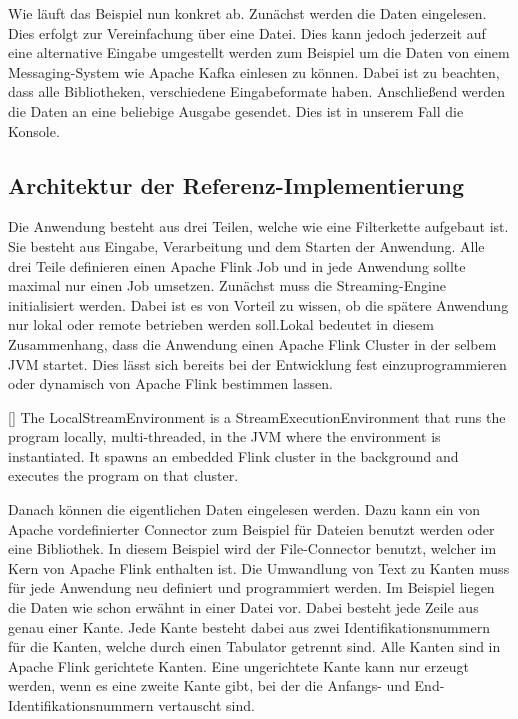 Wie läuft das Beispiel nun konkret ab. Zunächst werden die Daten eingelesen. Dies
erfolgt zur Vereinfachung über eine Datei. Dies kann jedoch jederzeit auf eine
alternative Eingabe umgestellt werden zum Beispiel um die Daten von einem
Messaging-System wie Apache Kafka einlesen zu können. Dabei ist zu beachten,
dass alle Bibliotheken, verschiedene Eingabeformate haben. Anschließend werden
die Daten an eine beliebige Ausgabe gesendet. Dies ist in unserem Fall die
Konsole.

\subsection{Architektur der Referenz-Implementierung}
Die Anwendung besteht aus drei Teilen, welche wie eine Filterkette aufgebaut ist.
Sie besteht aus Eingabe, Verarbeitung und dem Starten der Anwendung. Alle drei
Teile definieren einen Apache Flink Job und in jede Anwendung sollte maximal
nur einen Job umsetzen. Zunächst muss die Streaming-Engine initialisiert werden.
Dabei ist es von Vorteil zu wissen, ob die spätere Anwendung nur lokal oder
remote betrieben werden soll.Lokal bedeutet in diesem Zusammenhang, dass die
Anwendung einen Apache Flink Cluster in der selbem \gls{JVM} startet. Dies lässt
sich bereits bei der Entwicklung fest einzuprogrammieren oder dynamisch von Apache
Flink bestimmen lassen.

[\cite{Foundation2018}]{
The LocalStreamEnvironment is a StreamExecutionEnvironment that runs the program
locally, multi-threaded, in the JVM where the environment is instantiated. It
spawns an embedded Flink cluster in the background and executes the program on
that cluster.}

Danach können die eigentlichen Daten eingelesen werden. Dazu kann ein von Apache
vordefinierter Connector zum Beispiel für Dateien benutzt werden oder eine
Bibliothek. In diesem Beispiel wird der File-Connector benutzt, welcher im Kern
von Apache Flink enthalten ist. Die Umwandlung von Text zu Kanten muss für jede
Anwendung neu definiert und programmiert werden. Im Beispiel liegen die Daten
wie schon erwähnt in einer Datei vor. Dabei besteht jede Zeile aus genau einer
Kante. Jede Kante besteht dabei aus zwei Identifikationsnummern für die Kanten,
welche durch einen Tabulator getrennt sind. Alle Kanten sind in Apache Flink
gerichtete Kanten. Eine ungerichtete Kante kann nur erzeugt werden, wenn es eine
zweite Kante gibt, bei der die Anfangs- und End-Identifikationsnummern vertauscht
sind.

